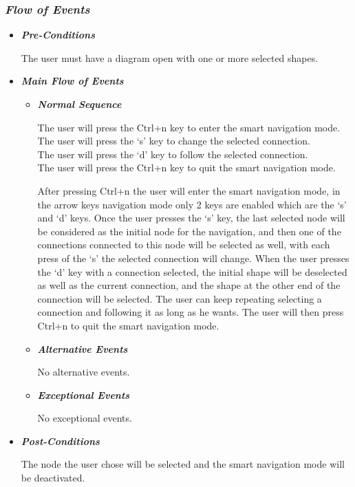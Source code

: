 \subsubsection {\em Flow of Events}
\begin{itemize}

\item {\bf \em Pre-Conditions}
\par \noindent
The user must have a diagram open with one or more selected shapes.

\item {\bf \em Main Flow of Events}

\begin{itemize}

\item {\bf \em Normal Sequence}
\par \noindent
The user will press the Ctrl+n key to enter the smart navigation mode.\\
The user will press the `s' key to change the selected connection.\\
The user will press the `d' key to follow the selected connection.\\
The user will press the Ctrl+n key to quit the smart navigation mode.

\par \noindent
After pressing Ctrl+n the user will enter the smart navigation mode, in the arrow keys navigation mode only 2 keys are enabled which are the `s' and `d' keys. Once the user presses the `s' key, the last selected node will be considered as the initial node for the navigation, and then one of the connections connected to this node will be selected as well, with each press of the `s' the selected connection will change. When the user presses the `d' key with a connection selected, the initial shape will be deselected as well as the current connection, and the shape at the other end of the connection will be selected. The user can keep repeating selecting a connection and following it as long as he wants. The user will then press Ctrl+n to quit the smart navigation mode.

\item {\bf \em Alternative Events}
\par \noindent
No alternative events.

\item {\bf \em Exceptional Events}
\par \noindent
No exceptional events.

\end{itemize}

\item {\bf \em Post-Conditions}
\par \noindent
The node the user chose will be selected and the smart navigation mode will be deactivated.

\end{itemize}


